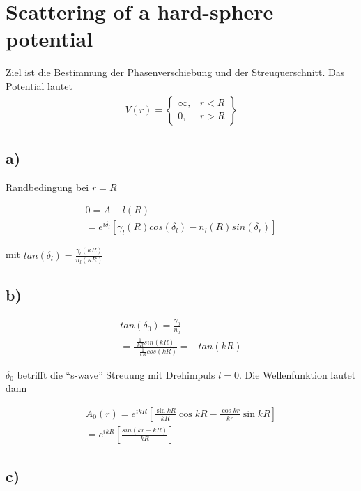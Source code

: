 \section{Scattering of a hard-sphere potential}

Ziel ist die Bestimmung der Phasenverschiebung und der Streuquerschnitt. Das
Potential lautet
\begin{align}
V \left(r\right) = 
\begin{Bmatrix}
\infty, & r<R \\
0, & r>R
\end{Bmatrix}
\end{align}

\subsection{a)}

Randbedingung bei $r=R$

\begin{align}
0 = A-l \left(R\right) \\
= e^{i\delta_l} \left[\gamma_l\left(R\right)cos \left(\delta_l\right) - n_l
\left(R\right) sin \left(\delta_r\right) \right]
\end{align}

mit $tan \left(\delta_l\right) = \frac{\gamma_l \left(\kappa R\right)}{n_l
\left(\kappa R\right)} $

\subsection{b)}

\begin{align}
tan \left(\delta_0\right) = \frac{\gamma_0}{n_0} \\
= \frac{\frac{1}{kR} sin \left(kR\right)}{-\frac{1}{kR} cos\left(kR\right) } =
-tan \left(kR\right)
\end{align}

$\delta_0$ betrifft die ``s-wave'' Streuung mit Drehimpuls $l=0$. Die
Wellenfunktion lautet dann
	
\begin{align}
A_0 \left(r\right) = e^{ikR} \left[ \frac{\sin{kR}}{kR} \cos{kR} -
\frac{\cos{kr}}{kr} \sin{kR} \right] \\
= e^{ikR} \left[ \frac{sin \left(kr-kR\right)}{kR} \right]
\end{align}

\subsection{c)}

